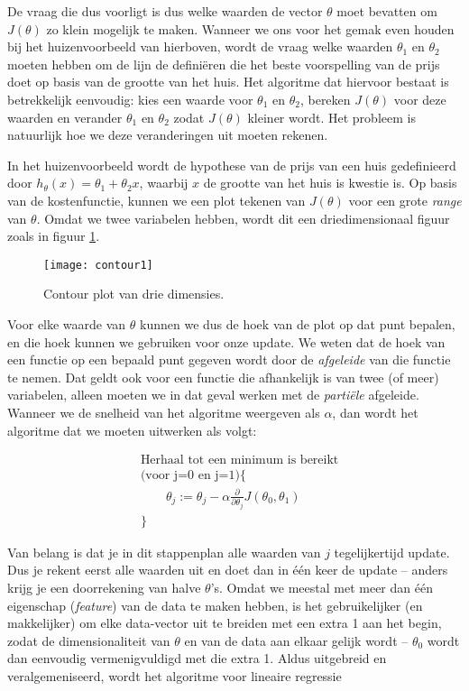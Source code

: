 De vraag die dus voorligt is dus welke waarden de vector $\theta$ moet bevatten om $J(\theta)$ zo klein mogelijk te maken. Wanneer we ons voor het gemak even houden bij het huizenvoorbeeld van hierboven, wordt de vraag welke waarden $\theta_1$ en $\theta_2$ moeten hebben om de lijn de definiëren die het beste voorspelling van de prijs doet op basis van de grootte van het huis. Het algoritme dat hiervoor bestaat is betrekkelijk eenvoudig: kies een waarde voor $\theta_1$ en $\theta_2$, bereken $J(\theta)$ voor deze waarden en verander $\theta_1$ en $\theta_2$ zodat $J(\theta)$ kleiner wordt. Het probleem is natuurlijk hoe we deze veranderingen uit moeten rekenen.

In het huizenvoorbeeld wordt de hypothese van de prijs van een huis gedefinieerd door $h_{\theta}(x) = \theta_1 + \theta_2x$, waarbij $x$ de grootte van het huis is kwestie is. Op basis van de kostenfunctie, kunnen we een plot tekenen van $J(\theta)$ voor een grote \textit{range} van $\theta$. Omdat we twee variabelen hebben, wordt dit een driedimensionaal figuur zoals in figuur \ref{img:contour1}.

\begin{figure}[h]
\centering
\texttt{[image: contour1]}
\caption{Contour plot van drie dimensies.\label{img:contour1}}
\end{figure}

Voor elke waarde van $\theta$ kunnen we dus de hoek van de plot op dat punt bepalen, en die hoek kunnen we gebruiken voor onze update. We weten dat de hoek van een functie op een bepaald punt gegeven wordt door de \textit{afgeleide} van die functie te nemen. Dat geldt ook voor een functie die afhankelijk is van twee (of meer) variabelen, alleen moeten we in dat geval werken met de \textit{partiële} afgeleide. Wanneer we de snelheid van het algoritme weergeven als $\alpha$, dan wordt het algoritme dat we moeten uitwerken als volgt:

\[
\begin{aligned}
&\textrm{Herhaal tot een minimum is bereikt} \\
& \textrm{(voor j=0 en j=1)} \{ \\
& \qquad\theta_j := \theta_j - \alpha \frac{\partial}{\partial\theta_j}J(\theta_0, \theta_1)\\
&\} 
\end{aligned}
\]

Van belang is dat je in dit stappenplan alle waarden van $j$ tegelijkertijd update. Dus je rekent eerst alle waarden uit en doet dan in één keer de update – anders krijg je een doorrekening van halve $\theta$'s. Omdat we meestal met meer dan één eigenschap (\textit{feature}) van de data te maken hebben, is het gebruikelijker (en makkelijker) om elke data-vector uit te breiden met een extra 1 aan het begin, zodat de dimensionaliteit van $\theta$ en van de data aan elkaar gelijk wordt – $\theta_0$ wordt dan eenvoudig vermenigvuldigd met die extra 1. Aldus uitgebreid en veralgemeniseerd, wordt het algoritme voor lineaire regressie

